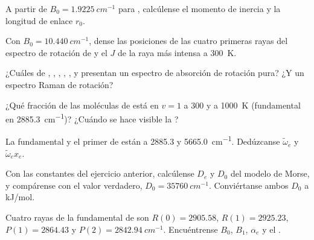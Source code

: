 \begin{exercise}[$\star$]\label{exo:b3:rovibrational-spectroscopy:1}
A partir de $B_0 = \qty{1.9225}{cm^{-1}}$ para , calcúlense el momento de inercia
y la longitud de enlace $r_0$.
\end{exercise}

\begin{exercise}[$\star$]\label{exo:b3:rovibrational-spectroscopy:2}
Con $B_0 = \qty{10.440}{cm^{-1}}$, dense las posiciones de las cuatro primeras rayas
del espectro de rotación de  y el $J$ de la raya más intensa a
\qty{300}{K}.
\end{exercise}

\begin{exercise}[$\star$]\label{exo:b3:rovibrational-spectroscopy:3}
¿Cuáles de , , , , ,  y  presentan un espectro
de absorción de rotación pura? ¿Y un espectro Raman de rotación?
\end{exercise}

\begin{exercise}[$\star$]\label{exo:b3:rovibrational-spectroscopy:4}
¿Qué fracción de las moléculas de  está en $v = 1$ a 300 y a \qty{1000}{K}
(fundamental en \qty{2885.3}{cm^{-1}})? ¿Cuándo se hace visible la ?
\end{exercise}

\begin{exercise}[$\star\star$]\label{exo:b3:rovibrational-spectroscopy:5}
La fundamental y el primer  de  están a 2885.3 y
\qty{5665.0}{cm^{-1}}. Dedúzcanse $\tilde\omega_e$ y $\tilde\omega_ex_e$.
\end{exercise}

\begin{exercise}[$\star\star$]\label{exo:b3:rovibrational-spectroscopy:6}
Con las constantes del ejercicio anterior, calcúlense $D_e$ y $D_0$ del
modelo de Morse, y compárense con el valor verdadero, $D_0 = \qty{35760}{cm^{-1}}$. Conviértanse ambos
$D_0$ a \unit{kJ/mol}.
\end{exercise}

\begin{exercise}[$\star\star$]\label{exo:b3:rovibrational-spectroscopy:7}
Cuatro rayas de la fundamental de  son $R(0) = 2905.58$, $R(1) = 2925.23$,
$P(1) = 2864.43$ y $P(2) = \qty{2842.94}{cm^{-1}}$. Encuéntrense $B_0$, $B_1$, $\alpha_e$ y
el .
\end{exercise}

